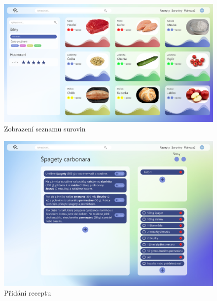 \begin{figure}[H]
    \includegraphics[width=\textwidth]{pdf/adobexd/suroviny}
    \caption{Zobrazení seznamu surovin} \label{picture:recipeo:navrh:suroviny}
\end{figure}

\begin{figure}[H]
    \includegraphics[width=\textwidth]{pdf/adobexd/vlozeni-receptu}
    \caption{Přidání receptu} \label{picture:recipeo:navrh:vlozeni-receptu}
\end{figure}

